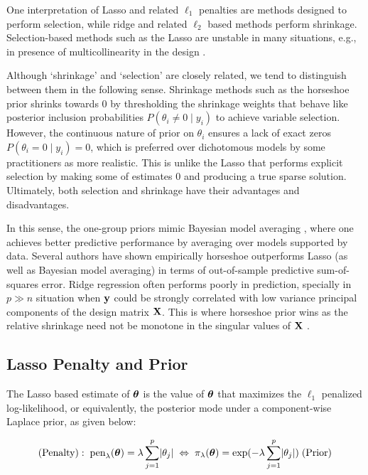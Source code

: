 \documentclass[sts,preprint]{imsart}
\begin{document}
One interpretation of Lasso and related $\ell_1$ penalties are methods designed to perform selection, while ridge and related $\ell_2$ based methods perform shrinkage. Selection-based methods such as the Lasso are unstable in many situations, e.g., in presence of multicollinearity in the design \citep[ch.3]{hastie_elements_2009}. 

Although `shrinkage' and `selection' are closely related, we tend to distinguish between them in the following sense. Shrinkage methods such as the horseshoe prior shrinks towards 0 by thresholding the shrinkage weights that behave like posterior inclusion probabilities $P(\theta_i \neq 0 \mid y_i)$ to achieve variable selection. 
However, the continuous nature of prior on $\theta_i$ ensures a lack of exact zeros $P(\theta_i = 0 
\mid y_i) = 0$, which is preferred over dichotomous models by some practitioners \citep{stephens2009bayesian} as more realistic.  This is unlike the Lasso that performs explicit selection by making some of estimates 0 and producing a true sparse solution. Ultimately, both selection and shrinkage have their advantages and disadvantages. 

In this sense, the one-group priors mimic Bayesian model averaging \citep{polson2010shrink}, where one achieves better predictive performance by averaging over models supported by data. Several authors \citep{polson2010shrink, polson2012local, datta2015search} have shown empirically horseshoe outperforms Lasso (as well as Bayesian model averaging) in terms of out-of-sample predictive sum-of-squares error. Ridge regression often performs poorly in prediction, specially in $p \gg n$ situation when ${\bf y}$ could be strongly correlated with low variance principal components of the design matrix ${\bf X}$. This is where horseshoe prior wins as the relative shrinkage need not be monotone in the singular values of ${\bf X}$ \citep{bhadra2016prediction}.

\subsection{Lasso Penalty and Prior}\label{sec:lasso}

The Lasso based estimate of $\boldsymbol{\theta}$ is the value of $\boldsymbol{\theta}$ that maximizes the $\ell_1$ penalized log-likelihood, or equivalently, the posterior mode under a component-wise Laplace prior, as given below: 

\begin{equation}
  (\text{Penalty}): \; \text{pen}_{\lambda}(\boldsymbol{\theta}) = \lambda \sum_{j = 1}^{p}  \lvert\theta_j\rvert \; \Leftrightarrow \; \pi_{\lambda}(\boldsymbol{\theta}) = \exp( - \lambda \sum_{j =
  1}^{p} \lvert\theta_j\rvert) \; (\text{Prior})
\end{equation}
\end{document}
